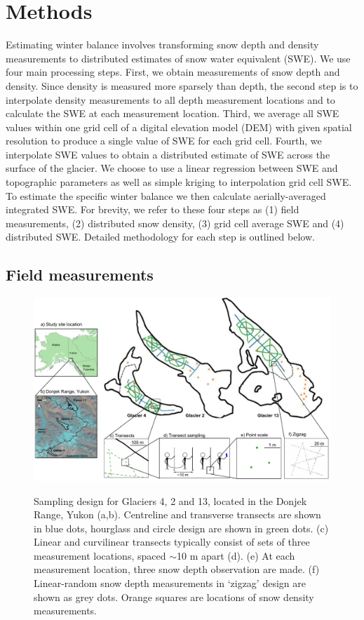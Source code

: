 \documentclass[review,oneside, letterpaper]{igs}
\begin{document}


\section{Methods}

Estimating winter balance involves transforming snow depth and density measurements to distributed estimates of snow water equivalent (SWE). We use four main processing steps. First, we obtain measurements of snow depth and density. Since density is measured more sparsely than depth, the second step is to interpolate density measurements to all depth measurement locations and to calculate the SWE at each measurement location. Third, we average all SWE values within one grid cell of a digital elevation model (DEM) with given spatial resolution to produce a single value of SWE for each grid cell. Fourth, we interpolate SWE values to obtain a distributed estimate of SWE across the surface of the glacier. We choose to use a linear regression between SWE and topographic parameters as well as simple kriging to interpolation grid cell SWE. To estimate the specific winter balance we then calculate aerially-averaged integrated SWE. For brevity, we refer to these four steps as (1) field measurements, (2) distributed snow density, (3) grid cell average SWE and (4) distributed SWE. Detailed methodology for each step is outlined below.

\subsection{Field measurements}

\begin{figure}
	\centering
	\includegraphics[width =\textwidth]{Sampling.pdf}\\
	\caption{Sampling design for Glaciers 4, 2 and 13, located in the Donjek Range, Yukon (a,b). Centreline and transverse transects are shown in blue dots, hourglass and circle design are shown in green dots. (c) Linear and curvilinear transects typically consist of sets of three measurement locations, spaced $\sim$10 m apart (d). (e) At each measurement location, three snow depth observation are made. (f) Linear-random snow depth measurements in `zigzag' design are shown as grey dots. Orange squares are locations of snow density measurements. }
	\label{fig:Sampling}
\end{figure}
\end{document}
